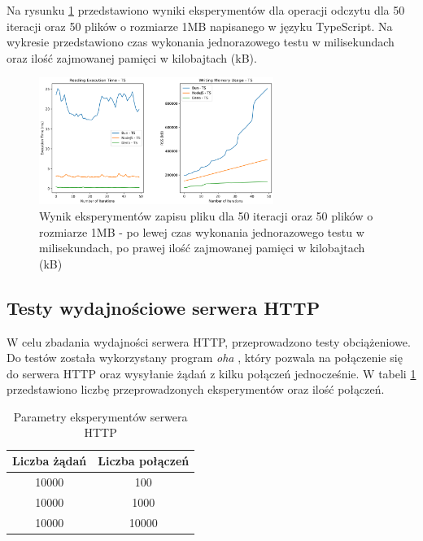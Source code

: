 Na rysunku \ref{fig:file_e2_writing_ts} przedstawiono wyniki eksperymentów dla operacji odczytu dla 50 iteracji oraz 50 plików o rozmiarze 1MB napisanego w języku TypeScript. Na wykresie przedstawiono czas wykonania jednorazowego testu w milisekundach oraz ilość zajmowanej pamięci w kilobajtach (kB).

\begin{figure}[H]
  \centering
  \includegraphics[width=0.68\textwidth]{Figures/files/files_writing_50_2000_50_ts.png}
  \caption{Wynik eksperymentów zapisu pliku dla 50 iteracji oraz 50 plików o rozmiarze 1MB - po lewej czas wykonania jednorazowego testu w milisekundach, po prawej ilość zajmowanej pamięci w kilobajtach (kB)}
  \label{fig:file_e2_writing_ts}
\end{figure}

\subsection{Testy wydajnościowe serwera HTTP}
W celu zbadania wydajności serwera HTTP, przeprowadzono testy obciążeniowe. Do testów została wykorzystany program \textit{oha} \cite{oha}, który pozwala na połączenie się do serwera HTTP oraz wysyłanie żądań z kilku połączeń jednocześnie. W tabeli \ref{tab:http_experiments} przedstawiono liczbę przeprowadzonych eksperymentów oraz ilość połączeń.

\begin{table}[H]
  \centering
  \caption{Parametry eksperymentów serwera HTTP}
  \begin{tabular}{|c|c|}
    \hline
    \textbf{Liczba żądań} & \textbf{Liczba połączeń}\\ \hline
    10000 & 100 \\ \hline
    10000 & 1000 \\ \hline
    10000 & 10000 \\ \hline
  \end{tabular}
  \label{tab:http_experiments}
\end{table}

